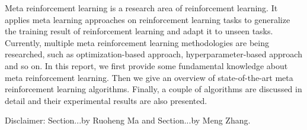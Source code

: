 Meta reinforcement learning is a research area of reinforcement learning. It applies meta learning approaches on reinforcement learning tasks to generalize the training result of reinforcement learning and adapt it to unseen tasks. Currently, multiple meta reinforcement learning methodologies are being researched, such as optimization-based approach, hyperparameter-based approach and so on. In this report, we first provide some fundamental knowledge about meta reinforcement learning. Then we give an overview of state-of-the-art meta reinforcement learning algorithms. Finally, a couple of algorithms are discussed in detail and their experimental results are also presented.\par
Disclaimer: {\normalfont Section...by Ruoheng Ma and Section...by Meng Zhang.}